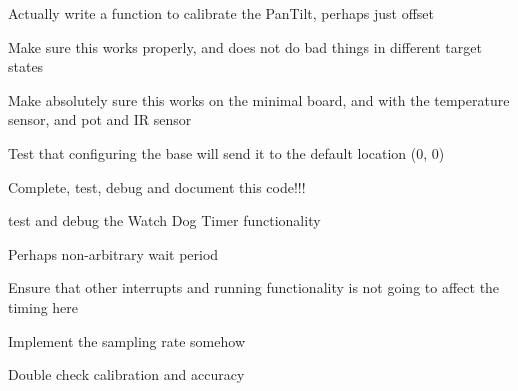 
\begin{DoxyRefList}
\item[\label{todo__todo000007}%
\hypertarget{todo__todo000007}{}%
Global \hyperlink{PanTilt_8h_a60e08860a1b4ca9efdc2dd43983731d5}{calibrate\+Pan\+Tilt} (\hyperlink{structDirection}{Direction} reference)]Actually write a function to calibrate the Pan\+Tilt, perhaps just offset  
\item[\label{todo__todo000012}%
\hypertarget{todo__todo000012}{}%
Global \hyperlink{Range_8c_a8606bd1052dde0e7c32eddad8699f4f4}{calibrate\+Range} (unsigned int reference)]Make sure this works properly, and does not do bad things in different target states  
\item[\label{todo__todo000010}%
\hypertarget{todo__todo000010}{}%
Global \hyperlink{Range_8h_ac7337ef2da4c9ab03257562ec33bbb8a}{configure\+A\+D} (void)]Make absolutely sure this works on the minimal board, and with the temperature sensor, and pot and I\+R sensor  
\item[\label{todo__todo000005}%
\hypertarget{todo__todo000005}{}%
Global \hyperlink{PanTilt_8h_ab7b8c8f7bf051b4f8e3b151f7b567127}{configure\+Base} (void)]Test that configuring the base will send it to the default location (0, 0)  
\item[\label{todo__todo000001}%
\hypertarget{todo__todo000001}{}%
Global \hyperlink{LCD_8h_aecaa9ab68490a0b8dedd20d200d5d0ef}{lcd\+Init} (void)]Complete, test, debug and document this code!!! 
\item[\label{todo__todo000003}%
\hypertarget{todo__todo000003}{}%
Global \hyperlink{newmain_8c_acdef7a1fd863a6d3770c1268cb06add3}{main} ()]test and debug the Watch Dog Timer functionality  
\item[\label{todo__todo000006}%
\hypertarget{todo__todo000006}{}%
Global \hyperlink{PanTilt_8h_a032fbfc434ca24d27d89b6d768455a42}{move} (\hyperlink{structDirection}{Direction} destination)]Perhaps non-\/arbitrary wait period  
\item[\label{todo__todo000009}%
\hypertarget{todo__todo000009}{}%
Global \hyperlink{PanTilt_8h_a7f353056fb02f0d95fd997198f5b186f}{pan\+Tilt\+I\+S\+R} (void)]Ensure that other interrupts and running functionality is not going to affect the timing here  
\item[\label{todo__todo000013}%
\hypertarget{todo__todo000013}{}%
Global \hyperlink{Range_8h_aff3698f3a7b3b5963d8e6b305a165d71}{range} (void)]Implement the sampling rate somehow  
\item[\label{todo__todo000014}%
\hypertarget{todo__todo000014}{}%
Global \hyperlink{Range_8c_a91b55894b9e6d74e4495ea610246c856}{range\+I\+R} (void)]Double check calibration and accuracy 


\end{DoxyRefList}
